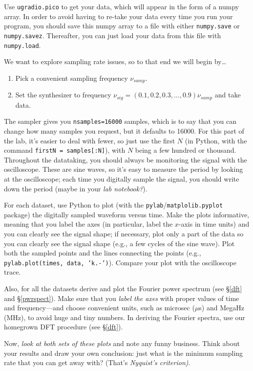 \documentclass[12pt,preprint]{aastex}
\begin{document}
Use {\tt ugradio.pico} to get your data, which will appear in the form
of a numpy array.  In order to avoid having to re-take your data every
time you run your program, you should save this numpy array to a file
with either {\tt numpy.save} or {\tt numpy.savez}.  Thereafter, you can
just load your data from this file with {\tt numpy.load}.

	We want to explore sampling rate issues, so to that end 
we will begin by\dots \begin{enumerate} 
	\item Pick a convenient sampling frequency $\nu_{samp}$.  
	\item Set the synthesizer to frequency $\nu_{sig} = (0.1, 0.2,
	  0.3, \dots, 0.9) \nu_{samp}$ and take data. 
\end{enumerate}

\noindent The sampler gives you {\tt nsamples=16000} samples, which is to
say that you can change how many samples you request, but it defaults to 16000. 
For this part of
the lab, it's easier to deal with fewer, so just use the first $N$ (in
Python, with the command {\tt firstN = samples[:N]}), with $N$ being a
few hundred or thousand.  Throughout the datataking, you should always
be monitoring the signal with the oscilloscope. These are sine waves, so
it's easy to measure the period by looking at the oscilloscope; each
time you digitally sample the signal, you should write down the period
(maybe in your {\it lab notebook?}).

For each dataset, use Python to plot (with the {\tt pylab}/{\tt matplolib.pyplot} package)
the digitally sampled waveform versus
time.  Make the plots informative, meaning that you label the
axes (in particular, label the $x$-axis in time units) and you can
clearly see the signal shape; if necessary, plot only a part of the data
so you can clearly see the signal shape (e.g., a few cycles of the sine
wave). Plot both the sampled points and the lines connecting the points
(e.g., {\tt pylab.plot(times, data, 'k.-')}).  Compare your plot with the
oscilloscope trace.  

Also, for all the datasets derive and plot the Fourier power spectrum
(see \S \ref{dft} and \S \ref{pwrspect}).  Make sure that you {\it label
  the axes} with proper values of time and frequency---and choose
convenient units, such as microsec ($\mu$s) and MegaHz (MHz), to avoid
huge and tiny numbers.  In deriving the Fourier spectra, use our
homegrown DFT procedure (see \S \ref{dft}).

Now, {\it look at both sets of these plots} and note any funny business.
Think about your results and draw your own conclusion: just what is the
minimum sampling rate that you can get away with? (That's {\it Nyquist's
  criterion)}. 
\end{document}
